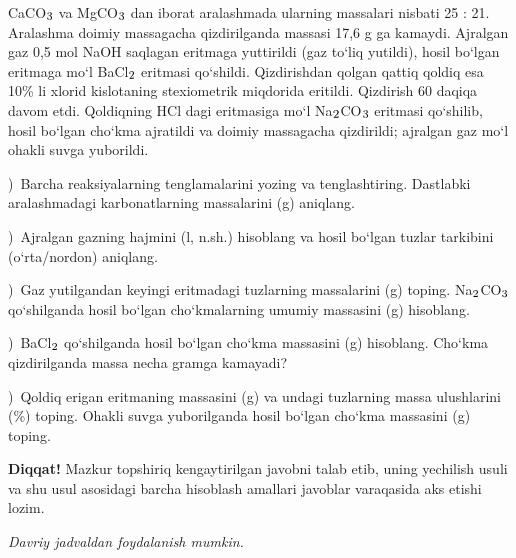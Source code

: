 \documentclass[11pt,a4paper]{article}
\renewcommand{\textsubscript}[1]{\ensuremath{_{\text{\fontsize{8}{8}\selectfont #1}}}}
\newcommand{\qsep}{\par\vspace{13pt}}
\newcommand{\diqqat}[1]{\par\smallskip\noindent\textbf{Diqqat!} #1\par\medskip}
\newcommand{\hdrpill}[1]{\begin{tikzpicture}[baseline=0pt]\node[fill=ygreen,text=white,rounded corners=8pt,inner xsep=10pt,inner ysep=5pt,font=\fontsize{13}{15}\bfseries\selectfont] at (0,0.475){#1};\end{tikzpicture}}
\newcommand{\curvar}{}\fancyhead[R]{\hdrpill{\curvar}}
\begin{document}
CaCO\textsubscript{3} va MgCO\textsubscript{3} dan iborat aralashmada ularning massalari nisbati 25 : 21. Aralashma doimiy massagacha qizdirilganda massasi 17,6 g ga kamaydi. Ajralgan gaz 0,5 mol NaOH saqlagan eritmaga yuttirildi (gaz to`liq yutildi), hosil bo`lgan eritmaga mo`l BaCl\textsubscript{2} eritmasi qo`shildi. Qizdirishdan qolgan qattiq qoldiq esa 10\% li xlorid kislotaning stexiometrik miqdorida eritildi. Qizdirish 60 daqiqa davom etdi. Qoldiqning HCl dagi eritmasiga mo`l Na\textsubscript{2}CO\textsubscript{3} eritmasi qo`shilib, hosil bo`lgan cho`kma ajratildi va doimiy massagacha qizdirildi; ajralgan gaz mo`l ohakli suvga yuborildi.\par
{})\ Barcha reaksiyalarning tenglamalarini yozing va tenglashtiring. Dastlabki aralashmadagi karbonatlarning massalarini (g) aniqlang.\par
{})\ Ajralgan gazning hajmini (l, n.sh.) hisoblang va hosil bo`lgan tuzlar tarkibini (o`rta/nordon) aniqlang.\par
{})\ Gaz yutilgandan keyingi eritmadagi tuzlarning massalarini (g) toping. Na\textsubscript{2}CO\textsubscript{3} qo`shilganda hosil bo`lgan cho`kmalarning umumiy massasini (g) hisoblang.\par
{})\ BaCl\textsubscript{2} qo`shilganda hosil bo`lgan cho`kma massasini (g) hisoblang. Cho`kma qizdirilganda massa necha gramga kamayadi?\par
{})\ Qoldiq erigan eritmaning massasini (g) va undagi tuzlarning massa ulushlarini (\%) toping. Ohakli suvga yuborilganda hosil bo`lgan cho`kma massasini (g) toping.\par
\diqqat{Mazkur topshiriq kengaytirilgan javobni talab etib, uning yechilish usuli va shu usul asosidagi barcha hisoblash amallari javoblar varaqasida aks etishi lozim.}\qsep
\newpage
\renewcommand{\curvar}{14-variant}
\thispagestyle{first}
\noindent\textit{Davriy jadvaldan foydalanish mumkin.}
\par\smallskip
\end{document}

